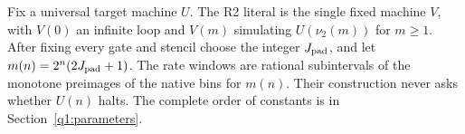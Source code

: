 Fix a universal target machine \(U\). The R2 literal is the single fixed machine \(V\), with \(V(0)\) an infinite loop and \(V(m)\) simulating \(U(\nu_2(m))\) for \(m\ge1\). After fixing every gate and stencil choose the integer \(J_{\rm pad}\), and let \(m(n)=2^n(2J_{\rm pad}+1)\). The rate windows are rational subintervals of the monotone preimages of the native bins for \(m(n)\). Their construction never asks whether \(U(n)\) halts. The complete order of constants is in Section~\ref{q1:parameters}.
